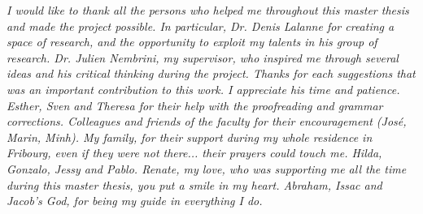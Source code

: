 \documentclass[
11pt, %
english, %
singlespacing, %
headsepline, %
chapterinoneline, %
]{MastersDoctoralThesis} %
\begin{document}
\begin{acknowledgements}
\addchaptertocentry{\acknowledgementname} %
\textit{
\newline
I would like to thank all the persons who helped me throughout this master thesis and made the
project possible. In particular,
\newline
\newline
Dr. Denis Lalanne for creating a space of research, and the opportunity to exploit my talents in his group of research. 
\newline
\newline
Dr. Julien Nembrini, my supervisor, who inspired me through several ideas and his critical thinking during the project. Thanks for each suggestions that was an important contribution to this work. I appreciate his time and patience.     
\newline
\newline
Esther, Sven and Theresa for their help with the proofreading and grammar corrections. 
\newline
\newline
Colleagues and friends of the faculty for their encouragement (José, Marin, Minh).
\newline
\newline
My family, for their support during my whole residence in Fribourg, even if they were not there... their prayers could touch me. Hilda, Gonzalo, Jessy and Pablo.  
\newline
\newline
Renate, my love, who was supporting me all the time during this master thesis, you put a smile in my heart. 
\newline
\newline
Abraham, Issac and Jacob's God, for being my guide in everything I do.
}
\end{acknowledgements}


\tableofcontents \mtcaddchapter %

\listoffigures \mtcaddchapter%

\listoftables \mtcaddchapter%

\end{document}
